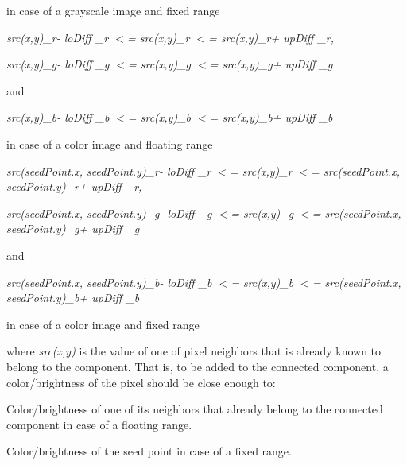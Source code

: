 in case of a grayscale image and fixed range


\begin{DoxyItemize}
\item {\itshape src(x\textquotesingle{},y\textquotesingle{})\+\_\+r-\/ lo\+Diff \+\_\+r $<$= src(x,y)\+\_\+r $<$= src(x\textquotesingle{},y\textquotesingle{})\+\_\+r+ up\+Diff \+\_\+r,}


\end{DoxyItemize}

{\itshape src(x\textquotesingle{},y\textquotesingle{})\+\_\+g-\/ lo\+Diff \+\_\+g $<$= src(x,y)\+\_\+g $<$= src(x\textquotesingle{},y\textquotesingle{})\+\_\+g+ up\+Diff \+\_\+g}

and

{\itshape src(x\textquotesingle{},y\textquotesingle{})\+\_\+b-\/ lo\+Diff \+\_\+b $<$= src(x,y)\+\_\+b $<$= src(x\textquotesingle{},y\textquotesingle{})\+\_\+b+ up\+Diff \+\_\+b}

in case of a color image and floating range


\begin{DoxyItemize}
\item {\itshape src(seed\+Point.\+x, seed\+Point.\+y)\+\_\+r-\/ lo\+Diff \+\_\+r $<$= src(x,y)\+\_\+r $<$= src(seed\+Point.\+x, seed\+Point.\+y)\+\_\+r+ up\+Diff \+\_\+r,}


\end{DoxyItemize}

{\itshape src(seed\+Point.\+x, seed\+Point.\+y)\+\_\+g-\/ lo\+Diff \+\_\+g $<$= src(x,y)\+\_\+g $<$= src(seed\+Point.\+x, seed\+Point.\+y)\+\_\+g+ up\+Diff \+\_\+g}

and

{\itshape src(seed\+Point.\+x, seed\+Point.\+y)\+\_\+b-\/ lo\+Diff \+\_\+b $<$= src(x,y)\+\_\+b $<$= src(seed\+Point.\+x, seed\+Point.\+y)\+\_\+b+ up\+Diff \+\_\+b}

in case of a color image and fixed range

where {\itshape src(x\textquotesingle{},y\textquotesingle{})} is the value of one of pixel neighbors that is already known to belong to the component. That is, to be added to the connected component, a color/brightness of the pixel should be close enough to\+:


\begin{DoxyItemize}
\item Color/brightness of one of its neighbors that already belong to the connected component in case of a floating range. 
\item Color/brightness of the seed point in case of a fixed range. 
\end{DoxyItemize}

